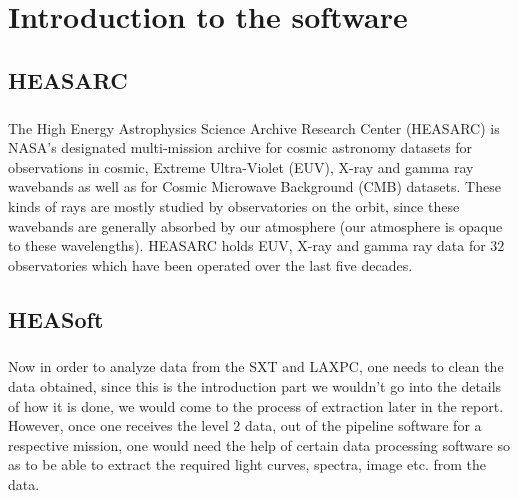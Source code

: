 \documentclass[a4paper,twoside]{report}
\numberwithin{equation}{section}
\begin{document}









\newpage
\chapter{Introduction to the software}
\section{HEASARC}
\paragraph{}
The High Energy Astrophysics Science Archive Research Center (HEASARC) is NASA’s designated multi-mission archive for cosmic astronomy datasets for observations in cosmic, Extreme Ultra-Violet (EUV), X-ray and gamma ray wavebands as well as for Cosmic Microwave Background (CMB) datasets. These kinds of rays are mostly studied by observatories on the orbit, since these wavebands are generally absorbed by our atmosphere (our atmosphere is opaque to these wavelengths). HEASARC holds EUV, X-ray and gamma ray data for $32$ observatories which have been operated over the last five decades. 
\section{HEASoft}
\paragraph{}
Now in order to analyze data from the SXT and LAXPC, one needs to clean the data obtained, since this is the introduction part we wouldn’t go into the details of how it is done, we would come to the process of extraction later in the report. However, once one receives the level $2$ data, out of the pipeline software for a respective mission, one would need the help of certain data processing software so as to be able to extract the required light curves, spectra, image etc. from the data. 
\end{document}
